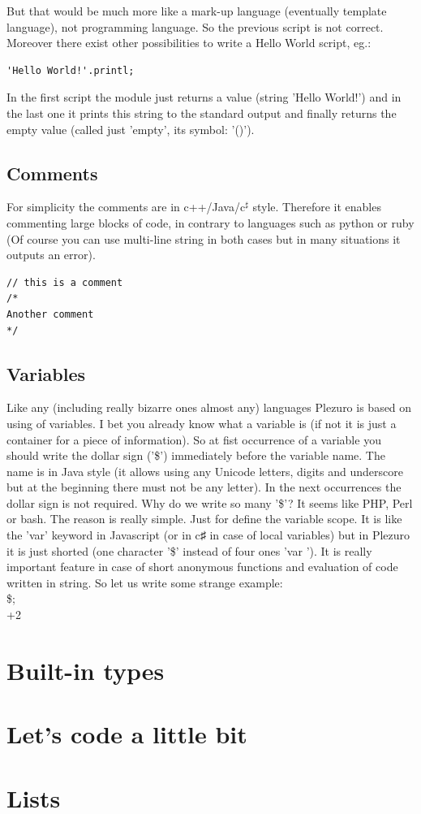 \documentclass{article}
\begin{document}
But that would be much more like a mark-up language (eventually template language), not programming language. So the previous script is not correct. Moreover there exist other possibilities to write a Hello World script, eg.:

\begin{lstlisting}
'Hello World!'.printl;
\end{lstlisting}

In the first script the module just returns a value (string 'Hello World!') and in the last one it prints this string to the standard output and finally returns the empty value (called just 'empty', its symbol: '()').

\subsection{Comments}
For simplicity the comments are in c++/Java/c$^\sharp$ style. Therefore it enables commenting large blocks of code, in contrary to languages such as python or ruby (Of course you can use multi-line string in both cases but in many situations it outputs an error).

\begin{lstlisting}
// this is a comment
/*
Another comment
*/
\end{lstlisting}

\subsection{Variables}
Like any (including really bizarre ones almost any)
languages Plezuro is based on using of variables. I bet you already know what a
variable is (if not it is just a container for a piece of information). So at
fist occurrence of a variable you should write the dollar sign ('\$') immediately
before the variable name. The name is in Java style (it allows using any Unicode
letters, digits and underscore but at the beginning there must not be any
letter). In the next occurrences the dollar sign is not required. Why do we
write so many '\$'? It seems like PHP, Perl or bash. The reason is really simple.
Just for define the variable scope. It is like the 'var' keyword in Javascript
(or in c♯ in case of local variables) but in Plezuro it is just shorted (one
character '\$' instead of four ones 'var '). It is really important feature in
case of short anonymous functions and evaluation of code written in string. So
let us write some strange example:\\

\$;\\
\textalpha+\textalpha\textrm2


\section{Built-in types}

\section{Let's code a little bit}

\section{Lists}
\end{document}
